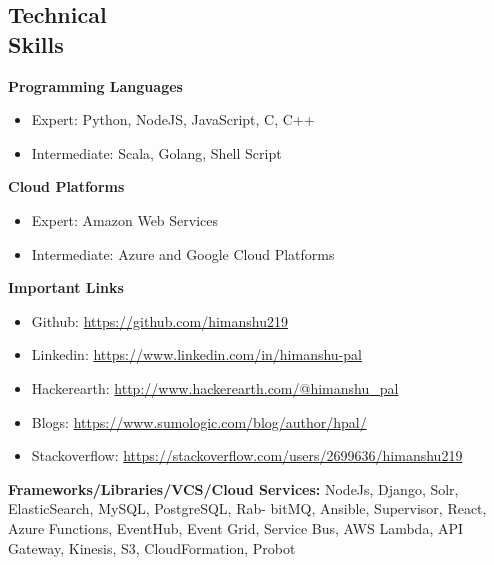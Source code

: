 \documentclass[margin,line]{resume}
\begin{document}
\begin{resume}
    \section{\mysidestyle Technical \\ Skills}
    \vspace{0mm}
     \textbf{Programming Languages}
     \begin{itemize}
          \item Expert: Python, NodeJS, JavaScript, C, C++
          \item Intermediate: Scala, Golang, Shell Script
     \end{itemize}
     \textbf{Cloud Platforms}
     \begin{itemize}
          \item Expert: Amazon Web Services
          \item Intermediate: Azure and Google Cloud Platforms
     \end{itemize}
     \textbf{Important Links}
     \begin{itemize}
          \item Github: \url{https://github.com/himanshu219}
          \item Linkedin: \url{https://www.linkedin.com/in/himanshu-pal}
          \item Hackerearth: \url{http://www.hackerearth.com/@himanshu_pal}
          \item Blogs: \url{https://www.sumologic.com/blog/author/hpal/}
          \item Stackoverflow: \url{https://stackoverflow.com/users/2699636/himanshu219}
     \end{itemize}
      \textbf{Frameworks/Libraries/VCS/Cloud Services:} NodeJs, Django, Solr, ElasticSearch, MySQL, PostgreSQL, Rab-
bitMQ, Ansible, Supervisor, React, Azure Functions, EventHub, Event Grid, Service Bus, AWS Lambda, API Gateway, Kinesis, S3, CloudFormation, Probot

\end{resume}
\end{document}
